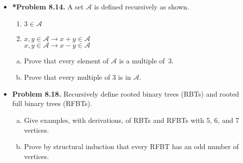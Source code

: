 \documentclass[11pt]{article}
\def\imp{\rightarrow}
\begin{document}
\begin{itemize}
\vspace{0.1in}

\item \textbf{*Problem 8.14.}
A set $\mathcal{A}$ is defined recursively as shown.
\begin{enumerate}[(1)]
\item $3\in\mathcal{A}$
\item $x,y\in\mathcal{A}\imp x+y\in\mathcal{A}$ \\
  $x,y\in\mathcal{A}\imp x-y\in\mathcal{A}$
\end{enumerate}
\begin{enumerate}[(a)]
\item Prove that every element of $\mathcal{A}$ is a multiple of~3.
\item Prove that every multiple of 3 is in $\mathcal{A}$.
\end{enumerate}

\vspace{0.1in}

\item \textbf{Problem 8.18.}
Recursively define rooted binary trees (RBTs) and rooted full binary trees (RFBTs).
\begin{enumerate}[(a)]
\item Give examples, with derivations, of RBTs and RFBTs with 5, 6, and 7 vertices.
\item Prove by structural induction that every RFBT has an odd number of vertices.
\end{enumerate}

\end{itemize}
\end{document}
